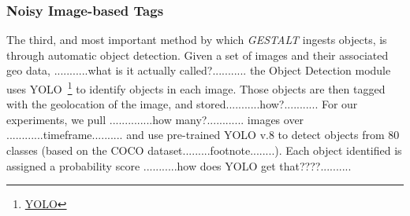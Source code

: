 \subsubsection{Noisy Image-based Tags}
The third, and most important method by which \emph{GESTALT} ingests objects, is through automatic object detection.
Given a set of images and their associated geo data, ...........what is it actually called?........... the Object Detection module uses YOLO~\footnote{\href{https://github.com/ultralytics/ultralytics}{YOLO}} to identify objects in each image. Those objects are then tagged with the geolocation of the image, and stored...........how?........... For our experiments, we pull ..............how many?............ images over ............timeframe.......... and use pre-trained YOLO v.8 to detect objects from 80 classes (based on the COCO dataset.........footnote........). Each object identified is assigned a probability score ...........how does YOLO get that????..........







